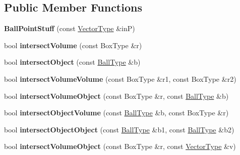 \subsection*{Public Member Functions}
\begin{DoxyCompactItemize}
\item 
\mbox{\label{struct_ball_point_stuff_a99062d9afc6afe1f8a7c8853cd723176}} 
{\bfseries Ball\+Point\+Stuff} (const \hyperlink{struct_vector_type}{Vector\+Type} \&inP)
\item 
\mbox{\label{struct_ball_point_stuff_a76bc551923878fb4d404b21c2c0500da}} 
bool {\bfseries intersect\+Volume} (const Box\+Type \&r)
\item 
\mbox{\label{struct_ball_point_stuff_ac9ee65aeabd3c24f7b6577b7dd17a8e8}} 
bool {\bfseries intersect\+Object} (const \hyperlink{struct_ball}{Ball\+Type} \&b)
\item 
\mbox{\label{struct_ball_point_stuff_a272cdbc5fd934c41f1a346d4c91d531a}} 
bool {\bfseries intersect\+Volume\+Volume} (const Box\+Type \&r1, const Box\+Type \&r2)
\item 
\mbox{\label{struct_ball_point_stuff_ae4baa20e64034648bffabcee2f649281}} 
bool {\bfseries intersect\+Volume\+Object} (const Box\+Type \&r, const \hyperlink{struct_ball}{Ball\+Type} \&b)
\item 
\mbox{\label{struct_ball_point_stuff_a80c45be6a67043c8384a0f8c0efa9869}} 
bool {\bfseries intersect\+Object\+Volume} (const \hyperlink{struct_ball}{Ball\+Type} \&b, const Box\+Type \&r)
\item 
\mbox{\label{struct_ball_point_stuff_af04b82e9447744045197d438f52ba517}} 
bool {\bfseries intersect\+Object\+Object} (const \hyperlink{struct_ball}{Ball\+Type} \&b1, const \hyperlink{struct_ball}{Ball\+Type} \&b2)
\item 
\mbox{\label{struct_ball_point_stuff_add0cd9514df2bc591981918cc97e5201}} 
bool {\bfseries intersect\+Volume\+Object} (const Box\+Type \&r, const \hyperlink{struct_vector_type}{Vector\+Type} \&v)

\end{DoxyCompactItemize}
